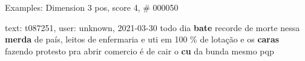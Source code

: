 \begin{frame}{Examples: Dimension 3 pos, score 4, \# 000050}
\footnotesize
\begin{exampleblock}{text: t087251, user: unknown, 2021-03-30}
todo dia \textbf{bate} recorde de morte nessa \textbf{merda} de país, leitos de 
enfermaria e uti em 100 \% de lotação e os \textbf{caras} fazendo protesto pra 
abrir comercio é de cair o \textbf{cu} da bunda mesmo pqp 
\end{exampleblock}
\end{frame}
